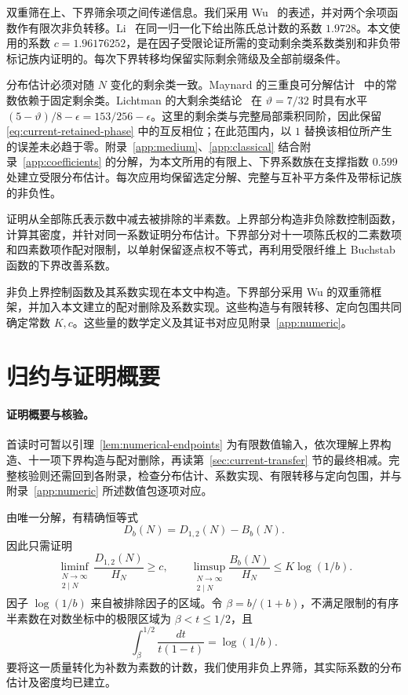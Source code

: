 双重筛在上、下界筛余项之间传递信息。我们采用 Wu~\cite{Wu} 的表述，并对两个余项函数作有限次非负转移。Li~\cite[定理~1.1]{RunboLi} 在同一归一化下给出陈氏总计数的系数 $1.9728$。本文使用的系数 $c=1.96176252$，是在因子受限论证所需的变动剩余类系数类别和非负带标记族内证明的。每次下界转移均保留实际剩余筛级及全部前缀条件。

分布估计必须对随 $N$ 变化的剩余类一致。Maynard 的三重良可分解估计~\cite[定义~2 及定理~1.1]{MaynardII} 中的常数依赖于固定剩余类。Lichtman 的大剩余类结论~\cite[定理~1.7]{Lichtman} 在 $\vartheta=7/32$ 时具有水平 $(5-\vartheta)/8-\epsilon=153/256-\epsilon$。这里的剩余类与完整局部乘积同阶，因此保留 \eqref{eq:current-retained-phase} 中的互反相位；在此范围内，以 $1$ 替换该相位所产生的误差未必趋于零。附录~\ref{app:medium}、\ref{app:classical} 结合附录~\ref{app:coefficients} 的分解，为本文所用的有限上、下界系数族在支撑指数 $0.599$ 处建立受限分布估计。每次应用均保留选定分解、完整与互补平方条件及带标记族的非负性。

证明从全部陈氏表示数中减去被排除的半素数。上界部分构造非负除数控制函数，计算其密度，并针对同一系数证明分布估计。下界部分对十一项陈氏权的二素数项和四素数项作配对限制，以单射保留逐点权不等式，再利用受限纤维上 Buchstab 函数的下界改善系数。

非负上界控制函数及其系数实现在本文中构造。下界部分采用 Wu 的双重筛框架，并加入本文建立的配对删除及系数实现。这些构造与有限转移、定向包围共同确定常数 $K,c$。这些量的数学定义及其证书对应见附录~\ref{app:numeric}。

\section{归约与证明概要}
\label{sec:outline}

\paragraph{证明概要与核验。}
首读时可暂以引理~\ref{lem:numerical-endpoints} 为有限数值输入，依次理解上界构造、十一项下界构造与配对删除，再读第~\ref{sec:current-transfer} 节的最终相减。完整核验则还需回到各附录，检查分布估计、系数实现、有限转移与定向包围，并与附录~\ref{app:numeric} 所述数值包逐项对应。

由唯一分解，有精确恒等式
\begin{equation}
                 D_b(N)=D_{1,2}(N)-B_b(N).
                 \label{eq:reduction}
\end{equation}
因此只需证明
\begin{equation}
 \liminf_{\substack{N\to\infty\\2\mid N}}
       \frac{D_{1,2}(N)}{H_N}\ge c,
 \qquad
 \limsup_{\substack{N\to\infty\\2\mid N}}
       \frac{B_b(N)}{H_N}\le K\log(1/b).
 \label{eq:two-estimates}
\end{equation}
因子 $\log(1/b)$ 来自被排除因子的区域。令 $\beta=b/(1+b)$，不满足限制的有序半素数在对数坐标中的极限区域为 $\beta<t\le1/2$，且
\[
 \int_\beta^{1/2}\frac{dt}{t(1-t)}=\log(1/b).
\]
要将这一质量转化为补数为素数的计数，我们使用非负上界筛，其实际系数的分布估计及密度均已建立。

